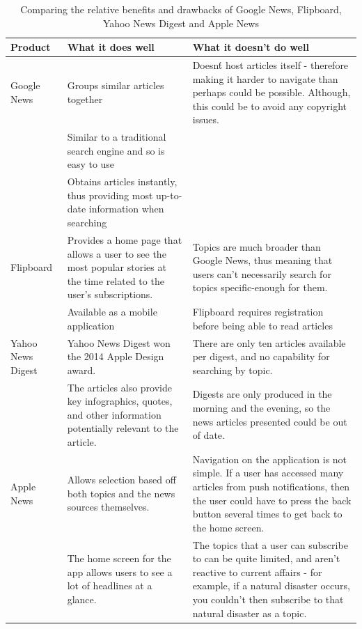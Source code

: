 \documentclass[12pt]{article}
\newcommand{\tabitem}{\makebox[1em][r]{\textbullet~}}
\begin{document}
\begin{table}
    \begin{tabular}{p{2.5cm}|p{8.75cm}|p{8.75cm}}
    \textbf{Product} & \textbf{What it does well} & \textbf{What it doesn't do well} \\ \hline
    Google News & \tabitem Groups similar articles together & \tabitem Doesn\'t host articles itself - therefore making it harder to navigate than perhaps could be possible. Although, this could be to avoid any copyright issues. \\ & \tabitem Similar to a traditional search engine and so is easy to use\\ & \tabitem Obtains articles instantly, thus providing most up-to-date information when searching  \\ \hline
    Flipboard & \tabitem Provides a home page that allows a user to see the most popular stories at the time related to the user's subscriptions. & \tabitem Topics are much broader than Google News, thus meaning that users can't necessarily search for topics specific-enough for them.\\ & \tabitem Available as a mobile application & \tabitem Flipboard requires registration before being able to read articles \\ \hline
    Yahoo News Digest & \tabitem Yahoo News Digest won the 2014 Apple\index{Apple} Design award\cite{appleDesignAward}\index{Apple!Design award}. & \tabitem There are only ten articles available per digest, and no capability for searching by topic. \\ & \tabitem The articles also provide key infographics, quotes, and other information potentially relevant to the article. & \tabitem Digests are only produced in the morning and the evening, so the news articles presented could be out of date. \\ \hline
    Apple News & \tabitem Allows selection based off both topics and the news sources themselves. & \tabitem Navigation on the application is not simple. If a user has accessed many articles from push notifications, then the user could have to press the back button several times to get back to the home screen.\\ & \tabitem The home screen for the app allows users to see a lot of headlines at a glance. & \tabitem The topics that a user can subscribe to can be quite limited, and aren't reactive to current affairs - for example, if a natural disaster occurs, you couldn't then subscribe to that natural disaster as a topic. \\
  \end{tabular}
  \caption[Related Products in the market and their benefits and drawbacks]{Comparing the relative benefits and drawbacks of Google News, Flipboard, Yahoo News Digest and Apple News}
  \label{relatedProductsTable}
\end{table}
\end{document}
